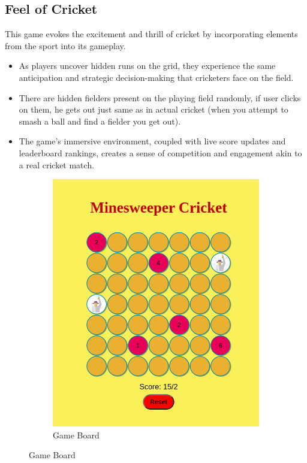 \documentclass{article}
\begin{document}
\subsection{Feel of Cricket}
This game evokes the excitement and thrill of cricket by incorporating elements from the sport into its gameplay. \\
\begin{itemize}
\item As players uncover hidden runs on the grid, they experience the same anticipation and strategic decision-making that cricketers face on the field.
\item There are hidden fielders present on the playing field randomly, if user clicks on them, he gets out just same as in actual cricket (when you attempt to smash a ball and find a fielder you get out).
\item The game's immersive environment, coupled with live score updates and leaderboard rankings, creates a sense of competition and engagement akin to a real cricket match. 
\end{itemize}
\begin{figure}[h!]
    \centering
    \begin{subfigure}[c]{0.49\textwidth}
        \centering
        \includegraphics[width=1\textwidth]{board.png}
        \caption{Game Board}
        \label{1a}
    \end{subfigure}
\end{figure}
\end{document}
